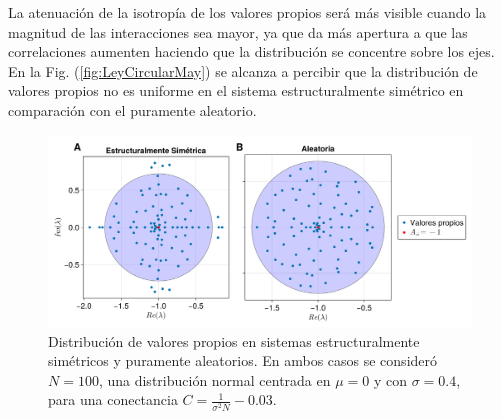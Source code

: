 La atenuación de la isotropía de los valores propios será más visible cuando la magnitud de las interacciones sea mayor, ya que da más apertura a que las correlaciones aumenten haciendo que la distribución se concentre sobre los ejes. En la Fig. (\ref{fig:LeyCircularMay}) se alcanza a percibir que la distribución de valores propios no es uniforme en el sistema estructuralmente simétrico en comparación con el puramente aleatorio. 

\begin{figure}[t]
	\centering
	\includegraphics[scale=0.2]{../Imagenes/LeyCircularMay2.png}
	\caption{Distribución de valores propios en sistemas estructuralmente simétricos y puramente aleatorios. En ambos casos se consideró $N=100$, una distribución normal centrada en $\mu=0$ y con $\sigma=0.4$, para una conectancia $C=\frac{1}{\sigma^2 N}-0.03$.}
	\label{fig:LeyCircularMay2}
\end{figure}

